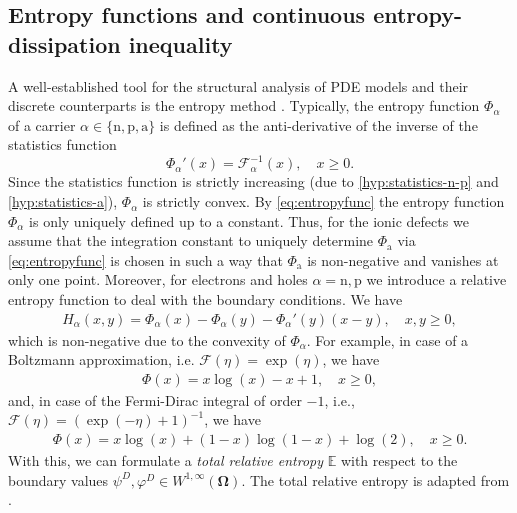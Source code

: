 \documentclass[10pt,a4paper, final]{article}
\def\electrons{\text{n}}
\def\holes{\text{p}}
\def\ions{\text{a}}
\theoremstyle{definition}								%
\numberwithin{equation}{section}
\numberwithin{figure}{section}
\numberwithin{theorem}{section}
\begin{document}
\subsection{Entropy functions and continuous entropy-dissipation inequality}
\label{sec:cont_entropy_dissipation}
A well-established tool for the structural analysis of PDE models and their discrete counterparts is the entropy method \cite{Jungel.2016}.
Typically, the entropy function $\Phi_\alpha$ of a carrier $\alpha \in \{\electrons, \holes, \ions \}$ is defined as the anti-derivative of the inverse of the statistics function
\begin{equation}\label{eq:entropyfunc}
    \Phi_\alpha'(x) = \mathcal{F}_\alpha^{-1}(x), \quad x \geq 0.
\end{equation}
Since the statistics function is strictly increasing (due to \eqref{hyp:statistics-n-p} and \eqref{hyp:statistics-a}), $\Phi_\alpha$ is strictly convex.
By \eqref{eq:entropyfunc} the entropy function $\Phi_\alpha$ is only uniquely defined up to a constant.
Thus, for the ionic defects we assume that the integration constant to uniquely determine $\Phi_\ions$ via \eqref{eq:entropyfunc} is chosen in such a way that $\Phi_\ions$ is non-negative and vanishes at only one point.
Moreover, for electrons and holes $\alpha = \electrons, \holes$  we introduce a relative entropy function to deal with the boundary conditions.
We have
\begin{align} \label{eq:H-function}
    H_\alpha(x,y) = \Phi_\alpha(x) - \Phi_\alpha(y) - \Phi_\alpha'(y)(x-y), \quad x, y \geq 0,
\end{align}
which is non-negative due to the convexity of $\Phi_\alpha$.
For example, in case of a Boltzmann approximation, i.e. $\mathcal{F}(\eta) = \exp(\eta)$, we have
\begin{align*}
    \Phi(x) = x\log(x) -x +1, \quad x \geq 0,
\end{align*}
and, in case of the Fermi-Dirac integral of order $-1$, i.e., $\mathcal{F}(\eta) = (\exp(-\eta) + 1)^{-1}$, we  have
\begin{align*}
    \Phi(x) = x\log(x) +(1-x)\log(1-x)+\log(2), \quad x \geq 0.
\end{align*}
With this, we can formulate a \textit{total relative entropy} $\mathbb{E}$ with respect to the boundary values $\psi^D, \varphi^D \in W^{1, \infty} ( \mathbf{\Omega})$.
The total relative entropy is adapted from \cite{Abdel2023Existence}.
\end{document}
